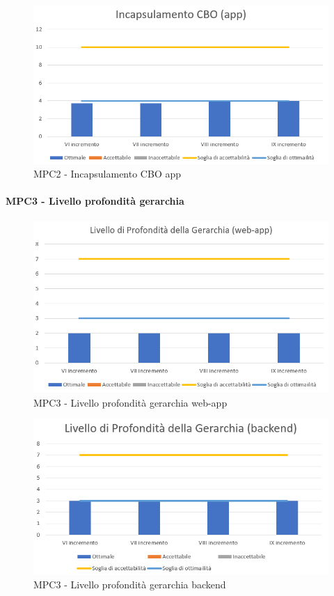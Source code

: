   \begin{figure}[h!]
    \centering
      \includegraphics[scale=1]{Immagini/CBO APPA.PNG}
    \caption{MPC2 - Incapsulamento CBO app}
  \end{figure}


  \clearpage
  \paragraph{MPC3 - Livello profondità gerarchia}
  \begin{figure}[h!]
    \centering
      \includegraphics[scale=1]{Immagini/LivProGer WAA.PNG}
    \caption{MPC3 - Livello profondità gerarchia web-app}
  \end{figure}

  \begin{figure}[h!]
    \centering
      \includegraphics[scale=1]{Immagini/LivProGer BEA.PNG}
    \caption{MPC3 - Livello profondità gerarchia backend}
  \end{figure}

